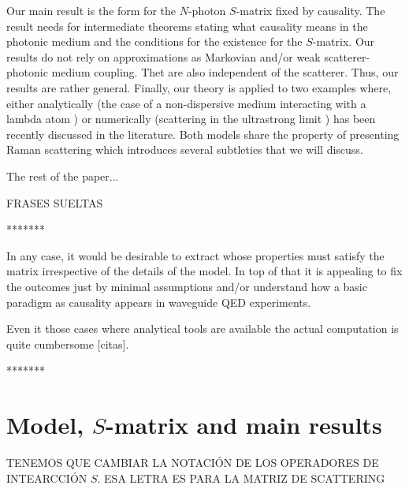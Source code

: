\documentclass[notitlepage, prx, preprint, amsmath,superscriptaddress,amssymb]{revtex4-1}
\begin{document}
Our main result is the form for  the $N$-photon $S$-matrix  fixed by causality.   The result needs for intermediate  theorems stating what causality means  in the photonic medium  and the conditions for the existence for the $S$-matrix.  Our results do not rely on  approximations as Markovian and/or weak scatterer-photonic medium coupling. Thet are also independent of the scatterer.   Thus, our results are rather general.    
Finally, our theory is applied to  two examples where, either analytically (the case of  a non-dispersive medium interacting with a lambda atom \cite{Xu2016}) or numerically (scattering in the ultrastrong limit \cite{Sanchez-Burillo2014, Sanchez-Burillo2015}) has been recently discussed in the literature.   Both models share the property of  presenting Raman scattering which introduces several subtleties that we will discuss. 


The rest of the paper...


FRASES SUELTAS

*******

In any case, it would be desirable to extract whose properties must satisfy the matrix irrespective of the details of the model.   In top of that it is appealing to fix the outcomes just by minimal assumptions and/or understand how a basic paradigm as causality appears in waveguide QED experiments.  

Even it those cases where analytical tools are available the actual computation is quite cumbersome [citas]. 

*******

\section{Model, $S$-matrix and main results} 

{\color{red}TENEMOS QUE CAMBIAR LA NOTACIÓN DE LOS OPERADORES DE INTEARCCIÓN $S$. ESA LETRA ES PARA LA MATRIZ DE SCATTERING}
\end{document}
